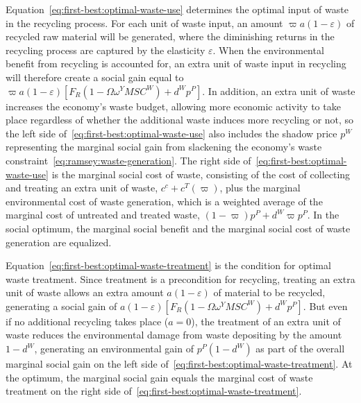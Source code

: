 Equation~\eqref{eq:first-best:optimal-waste-use} determines the optimal input of waste in the recycling process. For each unit of waste input, an amount $\varpi a(1-\varepsilon)$ of recycled raw material will be generated, where the diminishing returns in the recycling process are captured by the elasticity $\varepsilon$. When the environmental benefit from recycling is accounted for, an extra unit of waste input in recycling will therefore create a social gain equal to $\varpi a(1-\varepsilon)\left[F_R\left(1-\Omega\omega^Y MSC^W\right) + d^W p^P\right]$. In addition, an extra unit of waste increases the economy's waste budget, allowing more economic activity to take place regardless of whether the additional waste induces more recycling or not, so the left side of~\eqref{eq:first-best:optimal-waste-use} also includes the shadow price $p^W$ representing the marginal social gain from slackening the economy's waste constraint~\eqref{eq:ramsey:waste-generation}. The right side of~\eqref{eq:first-best:optimal-waste-use} is the marginal social cost of waste, consisting of the cost of collecting and treating an extra unit of waste, $c^c + c^T(\varpi)$, plus the marginal environmental cost of waste generation, which is a weighted average of the marginal cost of untreated and treated waste, $(1-\varpi)p^P + d^W\varpi p^P$. In the social optimum, the marginal social benefit and the marginal social cost of waste generation are equalized.

Equation~\eqref{eq:first-best:optimal-waste-treatment} is the condition for optimal waste treatment. Since treatment is a precondition for recycling, treating an extra unit of waste allows an extra amount $a(1-\varepsilon)$ of material to be recycled, generating a social gain of $a(1-\varepsilon)\left[F_R\left(1-\Omega\omega^Y MSC^W\right) + d^W p^P\right]$. But even if no additional recycling takes place ($a=0$), the treatment of an extra unit of waste reduces the environmental damage from waste depositing by the amount $1-d^W$, generating an environmental gain of $p^P(1-d^W)$ as part of the overall marginal social gain on the left side of~\eqref{eq:first-best:optimal-waste-treatment}. At the optimum, the marginal social gain equals the marginal cost of waste treatment on the right side of~\eqref{eq:first-best:optimal-waste-treatment}.

